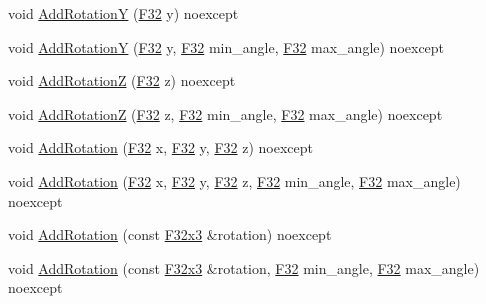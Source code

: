 \begin{DoxyCompactItemize}
void \mbox{\hyperlink{classmage_1_1_s_e_t_transform3_d_ad3b8ba4d1aba7c7860a33f5d4ee71fbc}{Add\+RotationY}} (\mbox{\hyperlink{namespacemage_aa97e833b45f06d60a0a9c4fc22ae02c0}{F32}} y) noexcept
\item 
void \mbox{\hyperlink{classmage_1_1_s_e_t_transform3_d_a42e7491929d986cc90f2275350e1534f}{Add\+RotationY}} (\mbox{\hyperlink{namespacemage_aa97e833b45f06d60a0a9c4fc22ae02c0}{F32}} y, \mbox{\hyperlink{namespacemage_aa97e833b45f06d60a0a9c4fc22ae02c0}{F32}} min\+\_\+angle, \mbox{\hyperlink{namespacemage_aa97e833b45f06d60a0a9c4fc22ae02c0}{F32}} max\+\_\+angle) noexcept
\item 
void \mbox{\hyperlink{classmage_1_1_s_e_t_transform3_d_a931a78ce245a05524ee15c0369ae4384}{Add\+RotationZ}} (\mbox{\hyperlink{namespacemage_aa97e833b45f06d60a0a9c4fc22ae02c0}{F32}} z) noexcept
\item 
void \mbox{\hyperlink{classmage_1_1_s_e_t_transform3_d_a4407648521b3b5922cdceb765fcf6445}{Add\+RotationZ}} (\mbox{\hyperlink{namespacemage_aa97e833b45f06d60a0a9c4fc22ae02c0}{F32}} z, \mbox{\hyperlink{namespacemage_aa97e833b45f06d60a0a9c4fc22ae02c0}{F32}} min\+\_\+angle, \mbox{\hyperlink{namespacemage_aa97e833b45f06d60a0a9c4fc22ae02c0}{F32}} max\+\_\+angle) noexcept
\item 
void \mbox{\hyperlink{classmage_1_1_s_e_t_transform3_d_af1eaed8c60010646105cf762d73f8153}{Add\+Rotation}} (\mbox{\hyperlink{namespacemage_aa97e833b45f06d60a0a9c4fc22ae02c0}{F32}} x, \mbox{\hyperlink{namespacemage_aa97e833b45f06d60a0a9c4fc22ae02c0}{F32}} y, \mbox{\hyperlink{namespacemage_aa97e833b45f06d60a0a9c4fc22ae02c0}{F32}} z) noexcept
\item 
void \mbox{\hyperlink{classmage_1_1_s_e_t_transform3_d_a27f96d6da5ab14d230a83e66325f4a47}{Add\+Rotation}} (\mbox{\hyperlink{namespacemage_aa97e833b45f06d60a0a9c4fc22ae02c0}{F32}} x, \mbox{\hyperlink{namespacemage_aa97e833b45f06d60a0a9c4fc22ae02c0}{F32}} y, \mbox{\hyperlink{namespacemage_aa97e833b45f06d60a0a9c4fc22ae02c0}{F32}} z, \mbox{\hyperlink{namespacemage_aa97e833b45f06d60a0a9c4fc22ae02c0}{F32}} min\+\_\+angle, \mbox{\hyperlink{namespacemage_aa97e833b45f06d60a0a9c4fc22ae02c0}{F32}} max\+\_\+angle) noexcept
\item 
void \mbox{\hyperlink{classmage_1_1_s_e_t_transform3_d_aabaefbdf636e707af67981b1b3a17aec}{Add\+Rotation}} (const \mbox{\hyperlink{namespacemage_a1e3c7a882af461f161caa1cbddaf1fa2}{F32x3}} \&rotation) noexcept
\item 
void \mbox{\hyperlink{classmage_1_1_s_e_t_transform3_d_a4b5d684ed1b021e9fd90b34c30431475}{Add\+Rotation}} (const \mbox{\hyperlink{namespacemage_a1e3c7a882af461f161caa1cbddaf1fa2}{F32x3}} \&rotation, \mbox{\hyperlink{namespacemage_aa97e833b45f06d60a0a9c4fc22ae02c0}{F32}} min\+\_\+angle, \mbox{\hyperlink{namespacemage_aa97e833b45f06d60a0a9c4fc22ae02c0}{F32}} max\+\_\+angle) noexcept

\end{DoxyCompactItemize}
